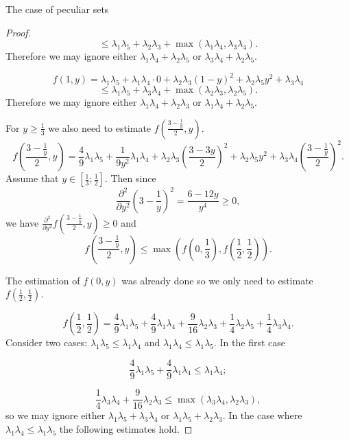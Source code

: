\documentclass[12pt]{article}
\begin{document}
\begin{section}{ The case of peculiar sets}
\begin{proof}
        $$
            \leq \lambda_{1}\lambda_{5}  + \lambda_{2}\lambda_{3} + \max(\lambda_{1}\lambda_{4},\lambda_{3}\lambda_{4}).
        $$
        Therefore we may ignore  either $\lambda_{1}\lambda_{4} + \lambda_{2}\lambda_{5}$ or $\lambda_{3}\lambda_{4} + \lambda_{2}\lambda_{5}$.

        $$
            f(1,y) = \lambda_{1}\lambda_{5} + \lambda_{1}\lambda_{4} \cdot 0 + \lambda_{2}\lambda_{3}(1-y)^2 + \lambda_{2}\lambda_{5}y^{2} + \lambda_{3}\lambda_{4}
        $$
        $$
            \leq \lambda_{1}\lambda_{5} + \lambda_{3}\lambda_{4} + \max (\lambda_{2}\lambda_{3},\lambda_{2}\lambda_{5}). 
        $$
        Therefore we may ignore  either $\lambda_{1}\lambda_{4} + \lambda_{2}\lambda_{3}$ or $\lambda_{1}\lambda_{4} + \lambda_{2}\lambda_{5}$.
        
        For $y\geq \frac{1}{3}$ we also need to estimate $f\left(\frac{3-\frac{1}{y}}{2}, y\right)$. 
        $$
         f\left(\frac{3-\frac{1}{y}}{2}, y\right) =  \frac{4}{9}\lambda_{1}\lambda_{5} + \frac{1}{9y^2}\lambda_{1}\lambda_{4}+ \lambda_{2}\lambda_{3}\left(\frac{3-3y}{2}\right)^2 + \lambda_{2}\lambda_{5}y^2 + \lambda_{3}\lambda_{4}\left(\frac{3-\frac{1}{y}}{2}\right)^2 .  
        $$
        Assume that $y\in \left[\frac{1}{3}; \frac{1}{2}\right]$. Then since
        $$
            \frac{\partial^{2}}{\partial y^2}\left(3-\frac{1}{y}\right)^2 = \frac{6 - 12y }{y^4}\geq 0,
        $$
        we have $\frac{\partial^{2}}{\partial y^2}f\left(\frac{3-\frac{1}{y}}{2}, y\right)\geq 0$ and $$
            f\left(\frac{3-\frac{1}{y}}{2}, y\right)\leq \max \left(f\left(0,\frac{1}{3}\right), f\left(\frac{1}{2}, \frac{1}{2}\right)\right).
        $$

        The estimation of $f(0,y)$ was already  done so we only need to estimate $f\left(\frac{1}{2},\frac{1}{2}\right).$

        $$
            f\left(\frac{1}{2},\frac{1}{2}\right) = \frac{4}{9}\lambda_{1}\lambda_{5} + \frac{4}{9}\lambda_{1}\lambda_{4}+ \frac{9}{16}\lambda_{2}\lambda_{3} + \frac{1}{4}\lambda_{2}\lambda_{5} + \frac{1}{4}\lambda_{3}\lambda_{4} . 
        $$
        Consider two cases: $\lambda_{1}\lambda_{5}\leq \lambda_{1}\lambda_{4}$ and $\lambda_{1}\lambda_{4}\leq \lambda_{1}\lambda_{5}$. In the first case 

        $$
             \frac{4}{9}\lambda_{1}\lambda_{5} + \frac{4}{9}\lambda_{1}\lambda_{4}\leq \lambda_{1}\lambda_{4};
        $$

        $$
            \frac{1}{4}\lambda_{3}\lambda_{4} + \frac{9}{16}\lambda_{2}\lambda_{3} \leq \max (\lambda_{3}\lambda_{4}, \lambda_{2}\lambda_{3} ),
        $$
        so we may ignore either $\lambda_{1}\lambda_{5} + \lambda_{3}\lambda_{4}$ or $\lambda_{1}\lambda_{5} + \lambda_{2}\lambda_{3}$. In the case where $\lambda_{1}\lambda_{4}\leq \lambda_{1}\lambda_{5}$ the following estimates hold.


\end{proof}
\end{section}
\end{document}
